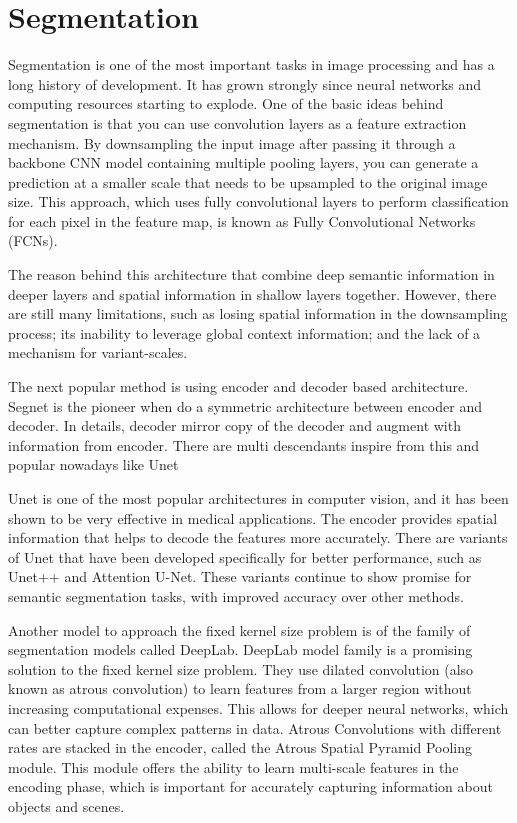 \section{Segmentation}
\label{sec:segmentation}
Segmentation is one of the most important tasks in image processing and has a long history of development. It has grown strongly since neural networks and computing resources starting to explode. One of the basic ideas behind segmentation is that you can use convolution layers as a feature extraction mechanism. By downsampling the input image after passing it through a backbone CNN model containing multiple pooling layers, you can generate a prediction at a smaller scale that needs to be upsampled to the original image size. This approach, which uses fully convolutional layers to perform classification for each pixel in the feature map, is known as Fully Convolutional Networks (FCNs)\cite{FCN}.

The reason behind this architecture that combine deep semantic information in deeper layers and spatial information in shallow layers together. However, there are still many limitations, such as losing spatial information in the downsampling process; its inability to leverage global context information; and the lack of a mechanism for variant-scales.

The next popular method is using encoder and decoder based architecture. Segnet\cite{segnet} is the pioneer when do a symmetric architecture between encoder and decoder. In details, decoder mirror copy of the decoder and augment with information from encoder. There are multi descendants inspire from this and popular nowadays like Unet\cite{Unet}

Unet\cite{Unet} is one of the most popular architectures in computer vision, and it has been shown to be very effective in medical applications. The encoder provides spatial information that helps to decode the features more accurately. There are variants of Unet that have been developed specifically for better performance, such as Unet++\cite{UnetPP} and Attention U-Net\cite{AttUnet}. These variants continue to show promise for semantic segmentation tasks, with improved accuracy over other methods.

Another model to approach the fixed kernel size problem is of the family of segmentation models called DeepLab\cite{Deeplab}. DeepLab model family is a promising solution to the fixed kernel size problem. They use dilated convolution (also known as atrous convolution) to learn features from a larger region without increasing computational expenses. This allows for deeper neural networks, which can better capture complex patterns in data. Atrous Convolutions with different rates are stacked in the encoder, called the Atrous Spatial Pyramid Pooling module. This module offers the ability to learn multi-scale features in the encoding phase, which is important for accurately capturing information about objects and scenes.

